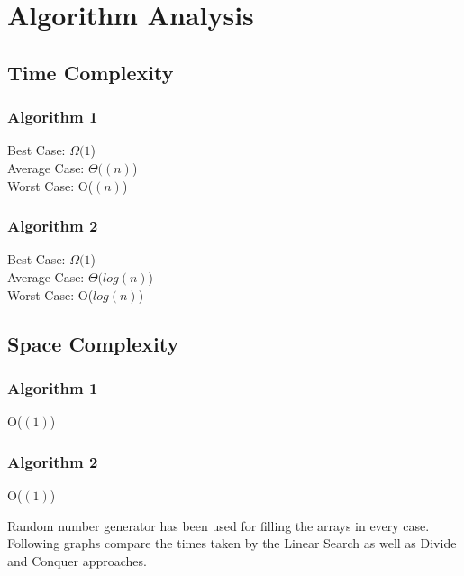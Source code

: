 \documentclass[conference]{IEEEtran}
\begin{document}
\section{Algorithm Analysis}

\subsection{Time Complexity}
    \subsubsection{Algorithm 1}
        \begin{itemize}
            Best Case:  $ \Omega(1$)\\
            Average Case: $ \Theta((n)$) \\
            Worst Case: O($(n)$)\\
        \end{itemize}
    \subsubsection{Algorithm 2}
        \begin{itemize}
            Best Case:  $ \Omega(1$)\\
            Average Case: $ \Theta(log(n)$) \\
            Worst Case: O($log(n)$)\\
        \end{itemize}

\subsection{Space Complexity}
    \subsubsection{Algorithm 1}
        \begin{itemize}
            O($(1)$)\\
        \end{itemize}
    \subsubsection{Algorithm 2}
        \begin{itemize}
            O($(1)$)\\
        \end{itemize}

Random number generator has been used for filling the arrays in every case.
Following graphs compare the times taken by the Linear Search as well as Divide and Conquer approaches.
\end{document}
